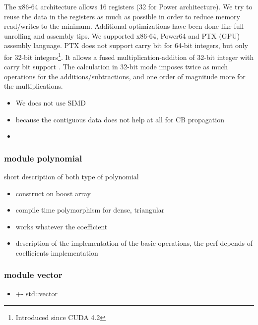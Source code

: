 \documentclass[oribibl]{llncs2e/llncs}
\begin{document}
The x86-64 architecture allows 16 registers (32 for Power architecture). We try to reuse the data in the registers as much as possible in order to reduce memory read/writes to the minimum.  Additional optimizations have been done like full unrolling and assembly tips. We  supported  x86-64, Power64 and PTX (GPU) assembly language. PTX does not support carry bit for 64-bit integers, but only for 32-bit integers\footnote{Introduced since CUDA 4.2}.  
It allows a fused multiplication-addition of 32-bit integer  with carry bit support \cite{CUDAasm}.  The calculation in 32-bit mode imposes twice as much operations for the additions/subtractions, and one order of magnitude more for the multiplications. 

\begin{itemize}
\item  We does not use SIMD 
\item because the contiguous data does not help at all for CB propagation
\item 
\end{itemize}

\subsubsection{module polynomial}

short description of both type of polynomial

\begin{itemize}
\item construct on boost array
\item compile time polymorphism for dense, triangular
\item works whatever the coefficient
\item description of the implementation of the basic operations, the perf depends of coefficients implementation
\end{itemize}

\subsubsection{module vector}
\begin{itemize}
\item +- std::vector
\end{itemize}
\end{document}
